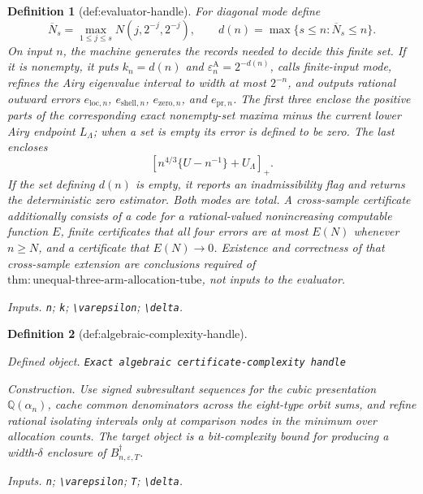 \documentclass{article}
\newtheorem{definition}{Definition}
\begin{document}
\begin{definition}[def:evaluator-handle]
For diagonal mode define
\[
\overline N_s=\max_{1\le j\le s}N(j,2^{-j},2^{-j}),
\qquad
d(n)=\max\{s\le n:\overline N_s\le n\}.
\]
On input \(n\), the machine generates the records needed to decide this finite set.  If it is nonempty, it puts
\(k_n=d(n)\) and \(\varepsilon_n^{\mathrm A}=2^{-d(n)}\), calls finite-input mode, refines the Airy eigenvalue interval to width at most \(2^{-n}\), and outputs rational outward errors
\(e_{\mathrm{loc},n}\), \(e_{\mathrm{shell},n}\),
\(e_{\mathrm{zero},n}\), and \(e_{\mathrm{pr},n}\).  The first three enclose the positive parts of the corresponding exact nonempty-set maxima minus the current lower Airy endpoint \(L_\Lambda\); when a set is empty its error is defined to be zero.  The last encloses
\[
\left[n^{4/3}\{U-n^{-1}\}+U_\Lambda\right]_+.
\]
If the set defining \(d(n)\) is empty, it reports an inadmissibility flag and returns the deterministic zero estimator.  Both modes are total.  A cross-sample certificate additionally consists of a code for a rational-valued nonincreasing computable function \(E\), finite certificates that all four errors are at most \(E(N)\) whenever \(n\ge N\), and a certificate that \(E(N)\to0\).  Existence and correctness of that cross-sample extension are conclusions required of
\(\mathrm{thm:unequal\text{-}three\text{-}arm\text{-}allocation\text{-}tube}\), not inputs to the evaluator.
\par\smallskip\noindent\emph{Inputs.} \texttt{n}; \texttt{k}; \texttt{\textbackslash{}\allowbreak{}varepsilon}; \texttt{\textbackslash{}\allowbreak{}delta}.
\end{definition}

\begin{definition}[def:algebraic-complexity-handle]\label{def:algebraic-complexity-handle}
\par\smallskip\noindent\emph{Defined object.} \texttt{Exact algebraic certificate-\allowbreak{}complexity handle}
\par\smallskip\noindent\emph{Construction.} Use signed subresultant sequences for the cubic presentation \(\mathbb Q(\alpha_n)\), cache common denominators across the eight-type orbit sums, and refine rational isolating intervals only at comparison nodes in the minimum over allocation counts. The target object is a bit-complexity bound for producing a width-\(\delta\) enclosure of \(B_{n,\varepsilon,T}^\dagger\).
\par\smallskip\noindent\emph{Inputs.} \texttt{n}; \texttt{\textbackslash{}\allowbreak{}varepsilon}; \texttt{T}; \texttt{\textbackslash{}\allowbreak{}delta}.
\end{definition}
\end{document}
